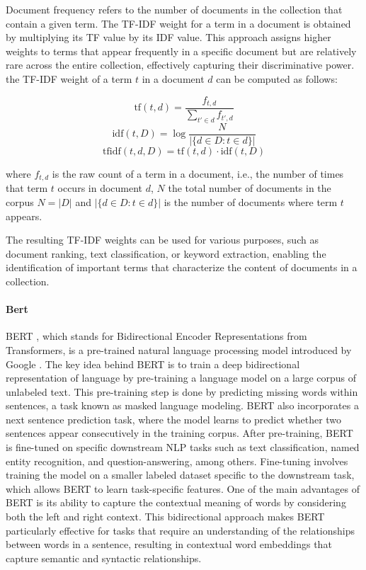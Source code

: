 \documentclass[a4paper,12pt]{article}
\begin{document}
Document frequency refers to the number of documents in the collection that contain a given term. The TF-IDF weight for a term in a document is obtained by multiplying its TF value by its IDF value. This approach assigns higher weights to terms that appear frequently in a specific document but are relatively rare across the entire collection, effectively capturing their discriminative power. the TF-IDF weight of a term $t$ in a document $d$ can be computed as follows:

$${\displaystyle \mathrm {tf} (t,d)={\frac {f_{t,d}}{\sum _{t'\in d}{f_{t',d}}}}}$$
$$ \mathrm{idf}(t, D) =  \log \frac{N}{|\{d \in D: t \in d\}|}$$
$${\displaystyle \mathrm {tfidf} (t,d,D)=\mathrm {tf} (t,d)\cdot \mathrm {idf} (t,D)}$$


where $f_{t,d}$ is the raw count of a term in a document, i.e., the number of times that term $t$ occurs in document $d$,
$N$ the total number of documents in the corpus $N=|D|$ and  $|\{d \in D: t \in d\}|$ is the number of documents where term $t$ appears.

The resulting TF-IDF weights can be used for various purposes, such as document ranking, text classification, or keyword extraction, enabling the identification of important terms that characterize the content of documents in a collection.

\paragraph{Bert}

BERT \cite{bert}, which stands for Bidirectional Encoder Representations from Transformers, is a pre-trained natural language processing model introduced by Google \cite{bert}.
The key idea behind BERT is to train a deep bidirectional representation of language by pre-training a language model on a large corpus of unlabeled text. This pre-training step is done by predicting missing words within sentences, a task known as masked language modeling. 
BERT also incorporates a next sentence prediction task, where the model learns to predict whether two sentences appear consecutively in the training corpus.
After pre-training, BERT is fine-tuned on specific downstream NLP tasks such as text classification, named entity recognition, and question-answering, among others. 
Fine-tuning involves training the model on a smaller labeled dataset specific to the downstream task, which allows BERT to learn task-specific features.
One of the main advantages of BERT is its ability to capture the contextual meaning of words by considering both the left and right context. 
This bidirectional approach makes BERT particularly effective for tasks that require an understanding of the relationships between words in a sentence, resulting in contextual word embeddings that capture semantic and syntactic relationships.
\end{document}
